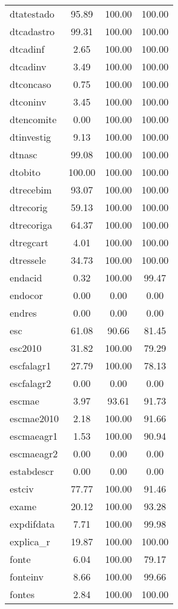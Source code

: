 \documentclass[
  12,
  table]{proadi}
\begin{document}
\begin{longtable}{lccc}
dtatestado & 95.89 & 100.00 & 100.00\\
dtcadastro & 99.31 & 100.00 & 100.00\\
dtcadinf & 2.65 & 100.00 & 100.00\\
\addlinespace
dtcadinv & 3.49 & 100.00 & 100.00\\
dtconcaso & 0.75 & 100.00 & 100.00\\
dtconinv & 3.45 & 100.00 & 100.00\\
dtencomite & 0.00 & 100.00 & 100.00\\
dtinvestig & 9.13 & 100.00 & 100.00\\
\addlinespace
dtnasc & 99.08 & 100.00 & 100.00\\
dtobito & 100.00 & 100.00 & 100.00\\
dtrecebim & 93.07 & 100.00 & 100.00\\
dtrecorig & 59.13 & 100.00 & 100.00\\
dtrecoriga & 64.37 & 100.00 & 100.00\\
\addlinespace
dtregcart & 4.01 & 100.00 & 100.00\\
dtressele & 34.73 & 100.00 & 100.00\\
endacid & 0.32 & 100.00 & 99.47\\
endocor & 0.00 & 0.00 & 0.00\\
endres & 0.00 & 0.00 & 0.00\\
\addlinespace
esc & 61.08 & 90.66 & 81.45\\
esc2010 & 31.82 & 100.00 & 79.29\\
escfalagr1 & 27.79 & 100.00 & 78.13\\
escfalagr2 & 0.00 & 0.00 & 0.00\\
escmae & 3.97 & 93.61 & 91.73\\
\addlinespace
escmae2010 & 2.18 & 100.00 & 91.66\\
escmaeagr1 & 1.53 & 100.00 & 90.94\\
escmaeagr2 & 0.00 & 0.00 & 0.00\\
estabdescr & 0.00 & 0.00 & 0.00\\
estciv & 77.77 & 100.00 & 91.46\\
\addlinespace
exame & 20.12 & 100.00 & 93.28\\
expdifdata & 7.71 & 100.00 & 99.98\\
explica\_r & 19.87 & 100.00 & 100.00\\
fonte & 6.04 & 100.00 & 79.17\\
fonteinv & 8.66 & 100.00 & 99.66\\
\addlinespace
fontes & 2.84 & 100.00 & 100.00\\

\end{longtable}
\end{document}
